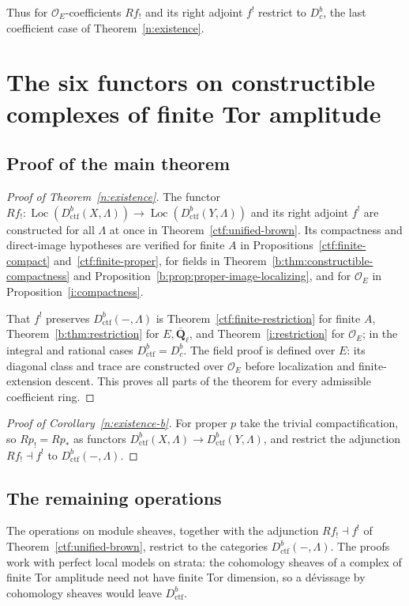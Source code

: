 \documentclass[11pt,a4paper]{article}
\numberwithin{equation}{section}
\theoremstyle{definition}
\theoremstyle{remark}
\newcommand{\Dbc}{D^b_c}
\newcommand{\Loc}{\operatorname{Loc}}
\newcommand{\Qbar}{\overline{\mathbf Q}_\ell}
\newcommand{\Dctf}{D^b_{\mathrm{ctf}}}
\begin{document}
Thus for $\mathcal O_E$-coefficients $Rf_!$ and its right adjoint $f^!$
restrict to $\Dbc$, the last coefficient case of
Theorem~\ref{n:existence}.

\section{The six functors on constructible complexes of finite Tor amplitude}
\label{n:proof}

\subsection{Proof of the main theorem}

\begin{proof}[Proof of Theorem~\ref{n:existence}]
The functor $Rf_!\colon\Loc(\Dctf(X,\Lambda))\to\Loc(\Dctf(Y,\Lambda))$
and its right adjoint $f^!$ are constructed for all $\Lambda$ at once in Theorem~\ref{ctf:unified-brown}.
Its compactness and direct-image hypotheses are verified for finite $A$
in Propositions~\ref{ctf:finite-compact} and~\ref{ctf:finite-proper},
for fields in Theorem~\ref{b:thm:constructible-compactness} and
Proposition~\ref{b:prop:proper-image-localizing}, and for
$\mathcal O_E$ in Proposition~\ref{i:compactness}.

That $f^!$ preserves $\Dctf(-,\Lambda)$ is
Theorem~\ref{ctf:finite-restriction} for finite $A$,
Theorem~\ref{b:thm:restriction} for $E,\Qbar$, and
Theorem~\ref{i:restriction} for $\mathcal O_E$; in the integral and
rational cases $\Dctf=\Dbc$. The field proof is defined over $E$: its
diagonal class and trace are constructed over $\mathcal O_E$ before
localization and finite-extension descent. This proves all parts of the
theorem for every admissible coefficient ring.
\end{proof}

\begin{proof}[Proof of Corollary~\ref{n:existence-b}]
For proper $p$ take the trivial compactification, so $Rp_!=Rp_*$ as functors
$\Dctf(X,\Lambda)\to\Dctf(Y,\Lambda)$, and restrict the adjunction $Rf_!\dashv f^!$ to $\Dctf(-,\Lambda)$.
\end{proof}

\subsection{The remaining operations}

The operations on module sheaves, together with the adjunction
$Rf_!\dashv f^!$ of Theorem~\ref{ctf:unified-brown}, restrict to the
categories $\Dctf(-,\Lambda)$. The proofs work with perfect local models
on strata: the cohomology sheaves of a complex of finite Tor amplitude
need not have finite Tor dimension, so a d\'evissage by cohomology
sheaves would leave $\Dctf$.
\end{document}
